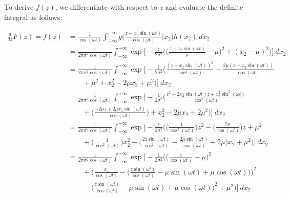 \documentclass[10pt, oneside]{article}   	%
\theoremstyle{definition}
\begin{document}
\begin{enumerate}[label=9.\arabic*]
\begin{enumerate}
To derive $f(z)$, we differentiate with respect to $z$ and evaluate the definite integral as follows:

	\begin{align*}
	\frac{d}{dz} F(z) = f(z) &= \frac{1}{\cos (\omega t)} \int^{+\infty}_{-\infty} g \bigg( \frac{z - x_2 \sin (\omega t) }{\cos (\omega t)} \bigg| x_2 \bigg) h(x_2) \ dx_2 \\
	&= \frac{1}{2 \pi \sigma^2 \cos (\omega t)} \int^{+\infty}_{-\infty} \exp \bigg[ -\frac{1}{2 \sigma^2} \bigg( \bigg( \frac{z - x_2 \sin(\omega t)}{\mu} - \mu \bigg)^2 + (x_2 - \mu)^2 \bigg) \bigg] \ dx_2\\
	&= \frac{1}{2 \pi \sigma^2 \cos (\omega t)} \int^{+\infty}_{-\infty} \exp \bigg[ -\frac{1}{2 \sigma^2} \bigg( \frac{(z - x_2 \sin(\omega t))^2}{\cos^2(\omega t)} - \frac{2\mu (z - x_2 \sin(\omega t))}{\cos(\omega t)} \\
	&\quad \quad + \mu^2 + x^2_2 - 2\mu x_2 + \mu^2 \bigg) \bigg] \ dx_2 \\
	&= \frac{1}{2 \pi \sigma^2 \cos (\omega t)} \int^{+\infty}_{-\infty} \exp \bigg[ -\frac{1}{2 \sigma^2} \bigg( \frac{z^2 - 2x_2 \sin(\omega t) z + x^2_2 \sin^2(\omega t)}{\cos^2(\omega t)} \\ 
	&\quad \quad + \bigg( \frac{-2\mu z + 2\mu x_2 \sin(\omega t)}{\cos(\omega t)} \bigg) + x^2_2 - 2\mu x_2 + 2\mu^2 \bigg) \bigg] \ dx_2 \\
	&= \frac{1}{2 \pi \sigma^2 \cos (\omega t)} \int^{+\infty}_{-\infty} \exp \bigg[ -\frac{1}{2 \sigma^2} \bigg( \bigg( \frac{1}{\cos^2(\omega t)} \bigg) z^2 - \bigg( \frac{2\mu}{\cos(\omega t)} \bigg) z + \mu^2 \\
	&\quad \quad + \bigg( \frac{1}{\cos^2(\omega t)} \bigg) x^2_2 - \bigg( \frac{2z \sin(\omega t)}{\cos^2(\omega t)} - \frac{2\mu \sin (\omega t)}{\cos (\omega t)} + 2\mu \bigg) x_2 + \mu^2 \bigg) \bigg] \ dx_2 \\
	&= \frac{1}{2 \pi \sigma^2 \cos (\omega t)} \int^{+\infty}_{-\infty} \exp \bigg[ -\frac{1}{2 \sigma^2} \bigg( \bigg( \frac{z}{\cos(\omega t)} - \mu \bigg)^2 \\ 
	&\quad \quad + \bigg( \frac{x_2}{\cos(\omega t)} - \bigg( \frac{z \sin(\omega t)}{\cos(\omega t)} - \mu \sin(\omega t) + \mu \cos(\omega t) \bigg) \bigg)^2 \\
	&\quad \quad - \bigg( \frac{z \sin(\omega t)}{\cos(\omega t)} - \mu \sin(\omega t) + \mu \cos(\omega t) \bigg)^2 + \mu^2 \bigg) \bigg] \ dx_2 \\
	\end{align*}
	

\end{enumerate}
\end{enumerate}
\end{document}
